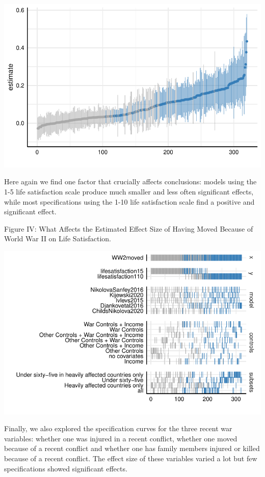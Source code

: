 \documentclass[
  letterpaper,
  DIV=11,
  numbers=noendperiod]{scrartcl}
\begin{document}
\includegraphics{PAPERLongTermImpactofWaronLifeSatisfaction_files/figure-pdf/results to show IIa-1.pdf}

Here again we find one factor that crucially affects conclusions: models
using the 1-5 life satisfaction scale produce much smaller and less
often significant effects, while most specifications using the 1-10 life
satisfaction scale find a positive and significant effect.

Figure IV: What Affects the Estimated Effect Size of Having Moved
Because of World War II on Life Satisfaction.

\includegraphics{PAPERLongTermImpactofWaronLifeSatisfaction_files/figure-pdf/results to show IIb-1.pdf}

Finally, we also explored the specification curves for the three recent
war variables: whether one was injured in a recent conflict, whether one
moved because of a recent conflict and whether one has family members
injured or killed because of a recent conflict. The effect size of these
variables varied a lot but few specifications showed significant
effects.
\end{document}
